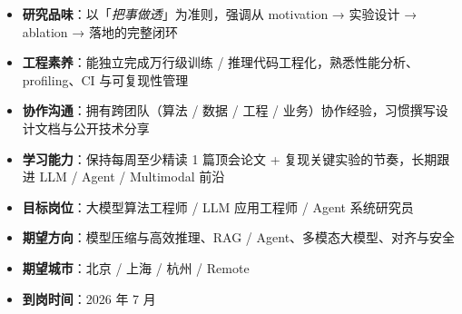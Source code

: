 

\begin{itemize}
  \item \textbf{研究品味}：以「\textit{把事做透}」为准则，强调从 motivation → 实验设计 → ablation → 落地的完整闭环
  \item \textbf{工程素养}：能独立完成万行级训练 / 推理代码工程化，熟悉性能分析、profiling、CI 与可复现性管理
  \item \textbf{协作沟通}：拥有跨团队（算法 / 数据 / 工程 / 业务）协作经验，习惯撰写设计文档与公开技术分享
  \item \textbf{学习能力}：保持每周至少精读 1 篇顶会论文 + 复现关键实验的节奏，长期跟进 LLM / Agent / Multimodal 前沿
\end{itemize}


\begin{itemize}
  \item \textbf{目标岗位}：大模型算法工程师 / LLM 应用工程师 / Agent 系统研究员
  \item \textbf{期望方向}：模型压缩与高效推理、RAG / Agent、多模态大模型、对齐与安全
  \item \textbf{期望城市}：北京 / 上海 / 杭州 / Remote
  \item \textbf{到岗时间}：2026 年 7 月
\end{itemize}
